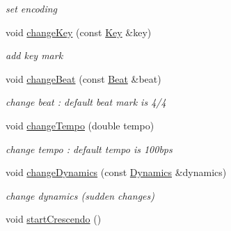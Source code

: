 \begin{DoxyCompactItemize}
\begin{DoxyCompactList}\small\item\em set encoding \end{DoxyCompactList}\item 
\hypertarget{classsinsy_1_1SinsyImpl_a254416e5a9315c3f0f37c6dac9a0402e}{void \hyperlink{classsinsy_1_1SinsyImpl_a254416e5a9315c3f0f37c6dac9a0402e}{change\-Key} (const \hyperlink{classsinsy_1_1Key}{\-Key} \&key)}\label{classsinsy_1_1SinsyImpl_a254416e5a9315c3f0f37c6dac9a0402e}

\begin{DoxyCompactList}\small\item\em add key mark \end{DoxyCompactList}\item 
\hypertarget{classsinsy_1_1SinsyImpl_a7d21a316b514633fef6ac3c1c600fb84}{void \hyperlink{classsinsy_1_1SinsyImpl_a7d21a316b514633fef6ac3c1c600fb84}{change\-Beat} (const \hyperlink{classsinsy_1_1Beat}{\-Beat} \&beat)}\label{classsinsy_1_1SinsyImpl_a7d21a316b514633fef6ac3c1c600fb84}

\begin{DoxyCompactList}\small\item\em change beat \-: default beat mark is 4/4 \end{DoxyCompactList}\item 
\hypertarget{classsinsy_1_1SinsyImpl_a6f88bda91b47135291d9c38bd484fca5}{void \hyperlink{classsinsy_1_1SinsyImpl_a6f88bda91b47135291d9c38bd484fca5}{change\-Tempo} (double tempo)}\label{classsinsy_1_1SinsyImpl_a6f88bda91b47135291d9c38bd484fca5}

\begin{DoxyCompactList}\small\item\em change tempo \-: default tempo is 100bps \end{DoxyCompactList}\item 
\hypertarget{classsinsy_1_1SinsyImpl_a2443b028208d4d3bf1b191505950714c}{void \hyperlink{classsinsy_1_1SinsyImpl_a2443b028208d4d3bf1b191505950714c}{change\-Dynamics} (const \hyperlink{classsinsy_1_1Dynamics}{\-Dynamics} \&dynamics)}\label{classsinsy_1_1SinsyImpl_a2443b028208d4d3bf1b191505950714c}

\begin{DoxyCompactList}\small\item\em change dynamics (sudden changes) \end{DoxyCompactList}\item 
\hypertarget{classsinsy_1_1SinsyImpl_ae74148d756d94d12acfc4026f0ef0629}{void \hyperlink{classsinsy_1_1SinsyImpl_ae74148d756d94d12acfc4026f0ef0629}{start\-Crescendo} ()}\label{classsinsy_1_1SinsyImpl_ae74148d756d94d12acfc4026f0ef0629}


\end{DoxyCompactItemize}

